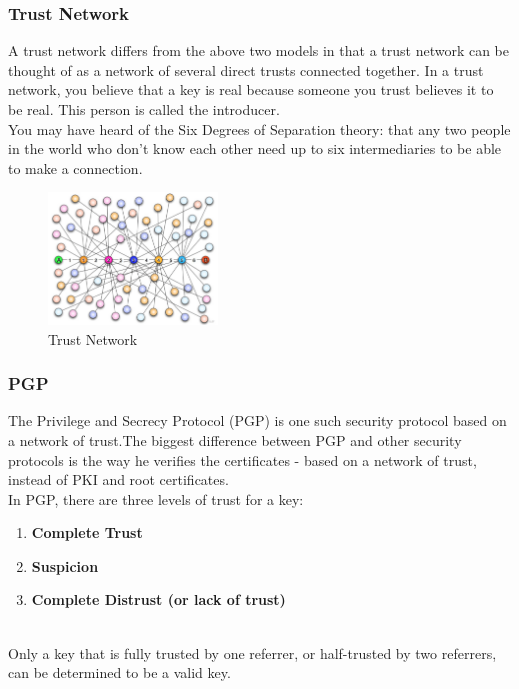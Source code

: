 \subsubsection{Trust Network}
A trust network differs from the above two models in that a trust network can be 
thought of as a network of several direct trusts connected together. In a trust 
network\cite{b27}, you believe that a key is real because someone you trust believes it to 
be real. This person is called the introducer\cite{b28}.
\\
You may have heard of the Six Degrees of Separation theory\cite{b37}: that any two people 
in the world who don't know each other need up to six intermediaries to be able 
to make a connection\cite{b29}.
\begin{figure}[H] %
    \centering %
    \includegraphics[width=0.4\textwidth]{figures/trustNet.png} %
    \caption{Trust Network} %
    \label{Fig.5: Trust Network} %
\end{figure}


\subsubsection{PGP}
The Privilege and Secrecy Protocol (PGP) is one such security protocol based on 
a network of trust\cite{b11}.The biggest difference between PGP and other security protocols 
is the way he verifies the certificates - based on a network of trust, instead of PKI 
and root certificates\cite{b12}.
\\
In PGP, there are three levels of trust for a key:

\begin{enumerate}[]
    \item \textbf{Complete Trust}
    \item \textbf{Suspicion}
    \item \textbf{Complete Distrust (or lack of trust)}
\end{enumerate}
\\
Only a key that is fully trusted by one referrer, or half-trusted by two referrers, 
can be determined to be a valid key.

